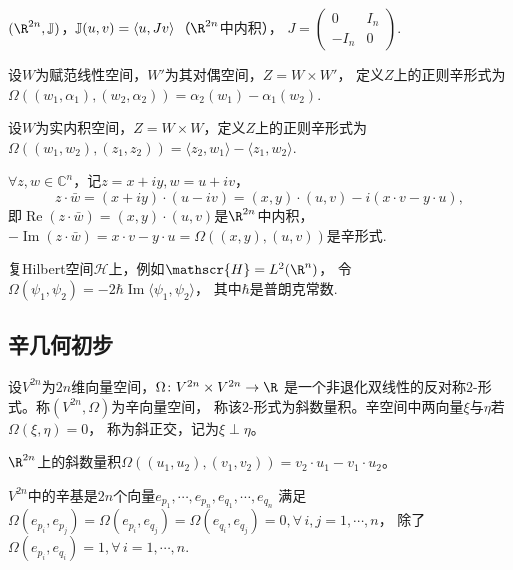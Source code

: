 \begin{example}
    $(\R^{2n},\j)$，$\mathbb{J}(u,v)=\langle u,Jv\rangle$（$\R^{2n}$中内积），
    $J=\begin{pmatrix}0&I_n\\-I_n&0\end{pmatrix}$.
\end{example}
\begin{example}[正则形式]
    设$W$为赋范线性空间，$W'$为其对偶空间，$Z=W\times W'$，
    定义$Z$上的正则辛形式为
    $\Omega((w_1,\alpha_1),(w_2,\alpha_2))=\alpha_2(w_1)-\alpha_1(w_2)$.
\end{example}
\begin{example}[与内积空间相关联的辛形式]
    设$W$为实内积空间，$Z=W\times W$，定义$Z$上的正则辛形式为
    $\Omega((w_1,w_2),(z_1,z_2))
    =\langle z_2,w_1\rangle-\langle z_1,w_2\rangle$.
\end{example}
\begin{example}
    $\forall z,w\in\mathbb{C}^n$，记$z=x+iy,w=u+iv$，
    $$z\cdot\bar{w}=(x+iy)\cdot(u-iv)=(x,y)\cdot(u,v)-i(x\cdot v-y\cdot u),$$
    即$\operatorname{Re}(z\cdot\bar{w})=(x,y)\cdot(u,v)$是$\R^{2n}$中内积，
    $-\operatorname{Im}(z\cdot\bar{w})=x\cdot v-y\cdot u
    =\Omega((x,y),(u,v))$是辛形式.
\end{example}
\begin{example}[量子力学的辛形式]
    复Hilbert空间$\mathscr{H}$上，例如$\mathscr{H}=L^2(\R^n)$，
    令$\Omega(\psi_1,\psi_2)
    =-2\hbar\operatorname{Im}\langle\psi_1,\psi_2\rangle$，
    其中$\hbar$是普朗克常数.
\end{example}

\subsection{辛几何初步}
\begin{definition}[辛向量空间]
    设$V^{2n}$为$2n$维向量空间，$\Omega\colon V^{2n}\times V^{2n}\to\R$
    是一个非退化双线性的反对称$2$-形式。称$(V^{2n},\Omega)$为辛向量空间，
    称该$2$-形式为斜数量积。辛空间中两向量$\xi$与$\eta$若$\Omega(\xi,\eta)=0$，
    称为斜正交，记为$\xi\perp\eta$。
\end{definition}
\begin{example}
    $\R^{2n}$上的斜数量积$\Omega((u_1,u_2),(v_1,v_2))=v_2\cdot u_1-v_1\cdot u_2$。
\end{example}
\begin{definition}[辛基]
    $V^{2n}$中的辛基是$2n$个向量$e_{p_1},\cdots,e_{p_n},e_{q_1},\cdots,e_{q_n}$
    满足$\Omega(e_{p_i},e_{p_j})=\Omega(e_{p_i},e_{q_j})
    =\Omega(e_{q_i},e_{q_j})=0,\forall\,i,j=1,\cdots,n$，
    除了$\Omega(e_{p_i},e_{q_i})=1,\forall\,i=1,\cdots,n$.
\end{definition}

